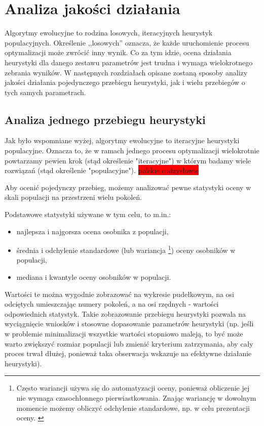 \documentclass[twoside]{iisthesis}
\newcommand{\todo}{\colorbox{red}}
\begin{document}
\section{Analiza jakości działania}

Algorytmy ewolucyjne to rodzina losowych, iteracyjnych heurystyk populacyjnych. Określenie ,,losowych'' oznacza, że każde uruchomienie procesu optymalizacji może zwrócić inny wynik. Co za tym idzie, ocena działania heurystyki dla danego zestawu parametrów jest trudna i wymaga wielokrotnego zebrania wyników. W następnych rozdziałach opisane zostaną sposoby analizy jakości działania pojedynczego przebiegu heurystyki, jak i wielu przebiegów o tych samych parametrach.

\subsection{Analiza jednego przebiegu heurystyki}

Jak było wspomniane wyżej, algorytmy ewolucyjne to iteracyjne heurystyki populacyjne. Oznacza to, że w ramach jednego procesu optymalizacji wielokrotnie powtarzamy pewien krok (stąd określenie "iteracyjne") w którym badamy wiele rozwiązań (stąd określenie "populacyjne"). \todo{polskie cudzysłowie}

Aby ocenić pojedynczy przebieg, możemy analizować pewne statystyki oceny w skali populacji na przestrzeni wielu pokoleń.

Podstawowe statystyki używane w tym celu, to m.in.:
\begin{itemize}
	\item najlepsza i najgorsza ocena osobnika z populacji,
	\item średnia i odchylenie standardowe (lub wariancja \footnote{Często wariancji używa się do automatyzacji oceny, ponieważ obliczenie jej nie wymaga czasochłonnego pierwiastkowania. Znając wariancję w dowolnym momencie możemy obliczyć odchylenie standardowe, np. w celu prezentacji oceny.  \label{footer_variance}}) oceny osobników w populacji,
	\item mediana i kwantyle oceny osobników w populacji.
\end{itemize}

Wartości te można wygodnie zobrazować na wykresie pudełkowym, na osi odciętych umieszczając numery pokoleń, a na osi rzędnych - wartości odpowiednich statystyk. Takie zobrazowanie przebiegu heurystyki pozwala na wyciągnięcie wniosków i stosowne dopasowanie parametrów heurystyki (np. jeśli w problemie minimalizacji wszystkie wartości stopniowo maleją, to być może warto zwiększyć rozmiar populacji lub zmienić kryterium zatrzymania, aby cały proces trwał dłużej, ponieważ taka obserwacja wskazuje na efektywne działanie heurystyki).
\end{document}
